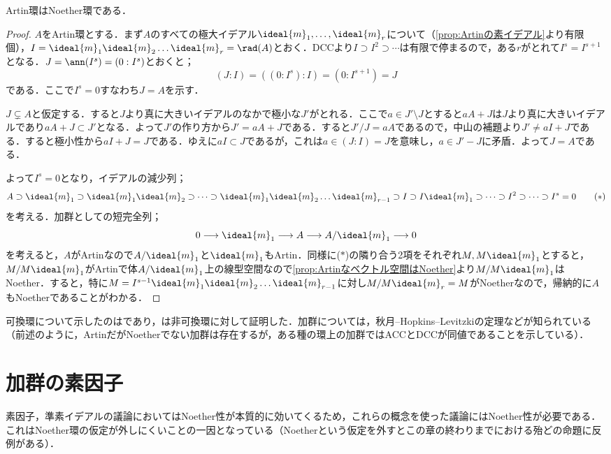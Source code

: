 \begin{thm}\label{thm:秋月}
	Artin環はNoether環である．
\end{thm}
\begin{proof}
	$A$をArtin環とする．まず$A$のすべての極大イデアル$\ideal{m}_1,\dots,\ideal{m}_r$について（\ref{prop:Artinの素イデアル}より有限個），$I= \ideal{m}_1\ideal{m}_2\dots \ideal{m}_r=\rad(A)$とおく．DCCより$I\supset I^2\supset\cdots$は有限で停まるので，ある$r$がとれて$I^s=I^{s+1}$となる．$J=\ann(I^s)=(0:I^s)$とおくと；
	\[(J:I)=((0:I^s):I)=(0:I^{s+1})=J\]
	である．ここで$I^s=0$すなわち$J=A$を示す．
	
	$J\subsetneq A$と仮定する．すると$J$より真に大きいイデアルのなかで極小な$J'$がとれる．ここで$a\in J'\setminus J$とすると$aA+J$は$J$より真に大きいイデアルであり$aA+J\subset J'$となる．よって$J'$の作り方から$J'=aA+J$である．すると$J'/J=aA$であるので，中山の補題より$J'\neq aI+J$である．すると極小性から$aI+J=J$である．ゆえに$aI\subset J$であるが，これは$a\in(J:I)=J$を意味し，$a\in J'-J$に矛盾．よって$J=A$である．
	
	よって$I^s=0$となり，イデアルの減少列；
	\[
	A\supset \ideal{m}_1\supset \ideal{m}_1 \ideal{m}_2\supset\dots\supset \ideal{m}_1 \ideal{m}_2\dots \ideal{m}_{r-1}\supset I\supset I \ideal{m}_1\supset\dots\supset I^2\supset\dots\supset I^s=0\tag{$\ast$}\]
	を考える．加群としての短完全列；
	\[0\longrightarrow \ideal{m}_1\longrightarrow A\longrightarrow A/ \ideal{m}_1\longrightarrow 0\]
	を考えると，$A$がArtinなので$A/ \ideal{m}_1$と$ \ideal{m}_1$もArtin．同様に($\ast$)の隣り合う2項をそれぞれ$M,M\ideal{m}_1$とすると，$M/M \ideal{m}_1$がArtinで体$A/ \ideal{m}_1$上の線型空間なので\ref{prop:Artinなベクトル空間はNoether}より$M/M \ideal{m}_1$はNoether．すると，特に$M=I^{s-1} \ideal{m}_1 \ideal{m}_2\dots \ideal{m}_{r-1}$に対し$M/M \ideal{m}_r=M$がNoetherなので，帰納的に$A$もNoetherであることがわかる．
\end{proof}

可換環について示したのは\cite{Akizuki1935}であり，\cite{Hopkins1939}は非可換環に対して証明した．加群については，秋月--Hopkins--Levitzkiの定理などが知られている（前述のように，ArtinだがNoetherでない加群は存在するが，ある種の環上の加群ではACCとDCCが同値であることを示している）．

\section{加群の素因子}

素因子，準素イデアルの議論においてはNoether性が本質的に効いてくるため，これらの概念を使った議論にはNoether性が必要である．これはNoether環の仮定が外しにくいことの一因となっている（Noetherという仮定を外すとこの章の終わりまでにおける殆どの命題に反例がある）．

